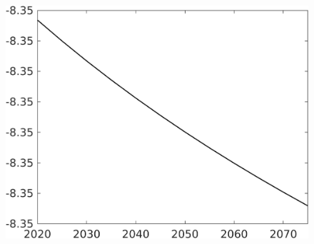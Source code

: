 \begin{figure}[h!!]
\begin{minipage}[]{0.32\textwidth}
	\end{minipage}
	\begin{minipage}[]{0.32\textwidth}
		\includegraphics[width=1\textwidth]{../../codding_model/own_basedOnFried/optimalPol_010922_revision/figures/all_13Sept22/CompTaufPER_bytaul_Reg0_N_spillover0_nsk0_xgr0_knspil0_sep0_LFlimit0_emsbase0_countec0_GovRev0_etaa0.79_lgd0.png}
	\end{minipage}

\end{figure}
